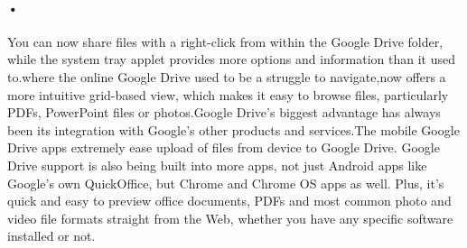 \documentclass[11pt]{article}
\begin{document}
\paragraph {•}
\cite{A6}You can now share files with a right-click from within the Google Drive folder, while the system tray applet provides more options and information than it used to.where the online Google Drive used to be a struggle to navigate,now offers a more intuitive grid-based view, which makes it easy to browse files, particularly PDFs, PowerPoint files or photos.Google Drive’s biggest advantage has always been its integration with Google’s other products and services.The mobile Google Drive apps extremely ease upload of files from device to Google Drive. Google Drive support is also being built into more apps, not just Android apps like Google’s own QuickOffice, but Chrome and Chrome OS apps as well. Plus, it’s quick and easy to preview office documents, PDFs and most common photo and video file formats straight from the Web, whether you have any specific software installed or not.

\newpage



\end{document}
